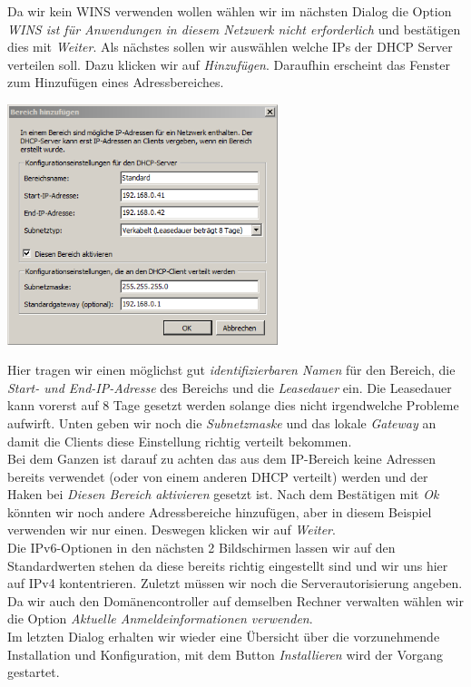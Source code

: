 \documentclass[12pt,a4paper,titlepage]{scrartcl} %
\begin{document}
Da wir kein WINS verwenden wollen wählen wir im nächsten Dialog die Option \emph{WINS ist für Anwendungen in diesem Netzwerk nicht erforderlich} und bestätigen dies mit \emph{Weiter}. Als nächstes sollen wir auswählen welche IPs der DHCP Server verteilen soll. Dazu klicken wir auf \emph{Hinzufügen}. Daraufhin erscheint das Fenster zum Hinzufügen eines Adressbereiches.\\

	\begin{center}\includegraphics[height=7cm]{Bilder/043(DHCP05)}\\ \end{center}
	
Hier tragen wir einen möglichst gut \emph{identifizierbaren Namen} für den Bereich, die \emph{Start- und End-IP-Adresse} des Bereichs und die \emph{Leasedauer} ein. Die Leasedauer kann vorerst auf 8 Tage gesetzt werden solange dies nicht irgendwelche Probleme aufwirft. Unten geben wir noch die \emph{Subnetzmaske} und das lokale \emph{Gateway} an damit die Clients diese Einstellung richtig verteilt bekommen.\\	
Bei dem Ganzen ist darauf zu achten das aus dem IP-Bereich keine Adressen bereits verwendet (oder von einem anderen DHCP verteilt) werden und der Haken bei \emph{Diesen Bereich aktivieren} gesetzt ist. Nach dem Bestätigen mit \emph{Ok} könnten wir noch andere Adressbereiche hinzufügen, aber in diesem Beispiel verwenden wir nur einen. Deswegen klicken wir auf \emph{Weiter}.\\
Die IPv6-Optionen in den nächsten 2 Bildschirmen lassen wir auf den Standardwerten stehen da diese bereits richtig eingestellt sind und wir uns hier auf IPv4 kontentrieren. Zuletzt müssen wir noch die Serverautorisierung angeben. Da wir auch den Domänencontroller auf demselben Rechner verwalten wählen wir die Option \emph{Aktuelle Anmeldeinformationen verwenden}.\\
Im letzten Dialog erhalten wir wieder eine Übersicht über die vorzunehmende Installation und Konfiguration, mit dem Button \emph{Installieren} wird der Vorgang gestartet.\\ 
\end{document}
